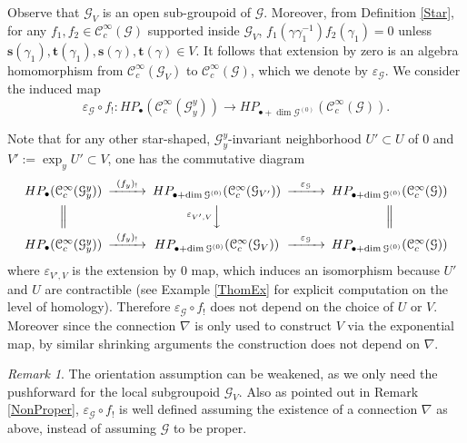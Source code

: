 \documentclass[a4paper]{amsart}
\newcommand{\maC}{\mathcal C}
\newcommand{\maG}{\mathcal G}
\newcommand{\bs}{\mathbf{s}}
\newcommand{\bt}{\mathbf{t}}
\newcommand\<{\langle}
\renewcommand\>{\rangle}
\theoremstyle{definition}
\theoremstyle{remark}
\newtheorem{rem}[theorem]{Remark}
\begin{document}
Observe that $\maG _V $ is an open sub-groupoid of $\maG$.
Moreover, from Definition \ref{Star}, for any $f_1, f_2 \in \maC _c ^\infty (\maG)$ supported inside $\maG _V$,
$f_1 (\gamma \gamma _1 ^{-1}) f_2 (\gamma _1) = 0$ unless $\bs (\gamma _1), \bt (\gamma _1), \bs (\gamma), \bt (\gamma) \in V$.
It follows that extension by zero is an algebra homomorphism from $\maC^\infty _c (\maG _V)$ to $\maC^\infty _c (\maG)$,
which we denote by $\varepsilon _\maG $.
We consider the induced map
$$ \varepsilon _\maG \circ f_! : H P _\bullet (\maC^\infty _c (\maG ^y _y))
\to H P _{\bullet + \dim \maG ^{(0)}} (\maC^\infty _c (\maG)).$$

Note that for any other star-shaped, $\maG ^y_y$-invariant neighborhood $U' \subset U$ of $0$ and $V' := \exp _y U' \subset V$,
one has the commutative diagram
$$
\begin{CD}
H P _\bullet (\maC^\infty _c (\maG ^y _y)) @>{(f _y)_!}>>
H P _{\bullet + \dim \maG ^{(0)}} (\maC^\infty _c (\maG _{V'}))
@>{\varepsilon _\maG }>>H P _{\bullet + \dim \maG ^{(0)}} (\maC^\infty _c (\maG)) \\
@| @V{\varepsilon _{V', V}}VV @| \\
H P _\bullet (\maC^\infty _c (\maG ^y _y)) @>{(f _y)_!}>>
H P _{\bullet + \dim \maG ^{(0)}} (\maC^\infty _c (\maG _{V}))
@>{\varepsilon _\maG }>>H P _{\bullet + \dim \maG ^{(0)}} (\maC^\infty _c (\maG))
\end{CD}
$$
where $\varepsilon _{V', V}$ is the extension by $0$ map,
which induces an isomorphism because $U'$ and $U$ are contractible
(see Example \ref{ThomEx} for explicit computation on the level of homology).
Therefore $ \varepsilon _\maG \circ f_! $ does not depend on the choice of $U$ or $V$.
Moreover since the connection $\nabla$ is only used to construct $V$ via the exponential map,
by similar shrinking arguments the construction does not depend on $\nabla$.

\begin{rem}
The orientation assumption can be weakened, as we only need the pushforward for the local subgroupoid $\maG _V$.
Also as pointed out in Remark \ref{NonProper},
$\varepsilon _\maG \circ f_! $ is well defined assuming the existence of a connection $\nabla$ as above,
instead of assuming $\maG$ to be proper.
\end{rem}
\end{document}
